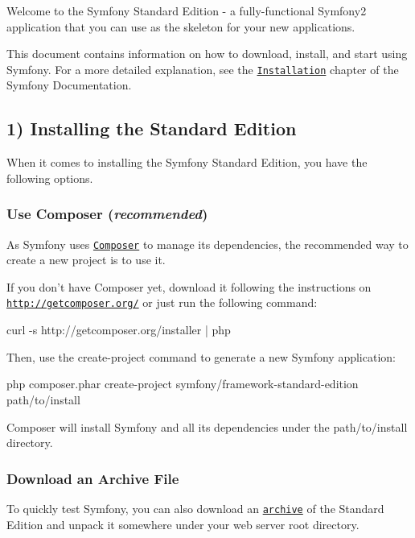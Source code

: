 Welcome to the Symfony Standard Edition -\/ a fully-\/functional Symfony2 application that you can use as the skeleton for your new applications.

This document contains information on how to download, install, and start using Symfony. For a more detailed explanation, see the \href{http://symfony.com/doc/2.3/book/installation.html}{\tt Installation} chapter of the Symfony Documentation.

\subsection*{1) Installing the Standard Edition }

When it comes to installing the Symfony Standard Edition, you have the following options.

\subsubsection*{Use Composer ({\itshape recommended})}

As Symfony uses \href{http://getcomposer.org/}{\tt Composer} to manage its dependencies, the recommended way to create a new project is to use it.

If you don't have Composer yet, download it following the instructions on \href{http://getcomposer.org/}{\tt http\+://getcomposer.\+org/} or just run the following command\+: \begin{DoxyVerb}curl -s http://getcomposer.org/installer | php
\end{DoxyVerb}


Then, use the {\ttfamily create-\/project} command to generate a new Symfony application\+: \begin{DoxyVerb}php composer.phar create-project symfony/framework-standard-edition path/to/install
\end{DoxyVerb}


Composer will install Symfony and all its dependencies under the {\ttfamily path/to/install} directory.

\subsubsection*{Download an Archive File}

To quickly test Symfony, you can also download an \href{http://symfony.com/download}{\tt archive} of the Standard Edition and unpack it somewhere under your web server root directory.

